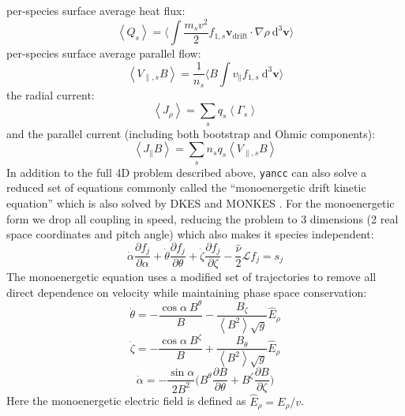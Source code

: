 \documentclass[11pt]{article}
\newcommand{\yancc}{\texttt{yancc}}
\newcommand{\fsa}[1]{\left\langle #1 \right\rangle}
\begin{document}
per-species surface average heat flux:
\begin{equation}
\fsa{Q_s} = \Bigg \langle \int \frac{m_s v^2}{2} f_{1,s}
\mathbf{v}_\mathrm{drift} \cdot \nabla \rho ~\mathrm{d}^3 \mathbf{v}
\Bigg \rangle
\end{equation}
per-species surface average parallel flow:
\begin{equation}
\fsa{V_{\parallel,s}B} = \frac{1}{n_s}\Bigg \langle B \int v_{\parallel} f_{1,s}
~\mathrm{d}^3 \mathbf{v} \Bigg \rangle
\end{equation}
the radial current:
\begin{equation}
\fsa{J_\rho} = \sum_s q_s \fsa{\Gamma_s}
\end{equation}
and the parallel current (including both bootstrap and Ohmic components):
\begin{equation}
\fsa{J_{\parallel} B} = \sum_s n_s q_s \fsa{V_{\parallel,s} B}
\end{equation}
In addition to the full 4D problem described above, \yancc{} can also solve a
reduced set of equations commonly called the ``monoenergetic drift kinetic
equation'' which is also solved by DKES \cite{hirshman_plasma_1986} and MONKES
\cite{escoto_monkes_2024}. For the
monoenergetic form we drop all coupling in speed, reducing the problem to 3
dimensions (2 real space coordinates and pitch angle) which also makes it
species independent:
\begin{equation}
\dot{\alpha} \frac{\partial f_{j}}{\partial \alpha}
+ \dot{\theta} \frac{\partial f_{j}}{\partial \theta}
+ \dot{\zeta} \frac{\partial f_{j}}{\partial \zeta}
- \frac{\hat{\nu}}{2} \mathcal{L} f_{j} = s_j
\end{equation}
The monoenergetic equation uses a modified set of trajectories to remove all direct
dependence on velocity while maintaining phase space conservation:
\begin{equation}
\dot{\theta} = -\frac{ \cos{\alpha}~ B^\theta}{B}
- \frac{B_\zeta}{\fsa{B^2} \sqrt{g}}\hat{E}_\rho
\end{equation}
\begin{equation}
\dot{\zeta} = -\frac{\cos{\alpha} ~ B^\zeta}{B}
+ \frac{B_\theta}{\fsa{B^2} \sqrt{g}}\hat{E}_\rho
\end{equation}
\begin{equation}
\dot{\alpha} = - \frac{\sin{\alpha}}{2 B^2}
\Bigg( B^\theta \frac{\partial B}{\partial \theta}
+ B^\zeta \frac{\partial B}{\partial \zeta} \Bigg)
\end{equation}
Here the monoenergetic electric field is defined as $\hat{E}_\rho = E_\rho/v$.
\end{document}
